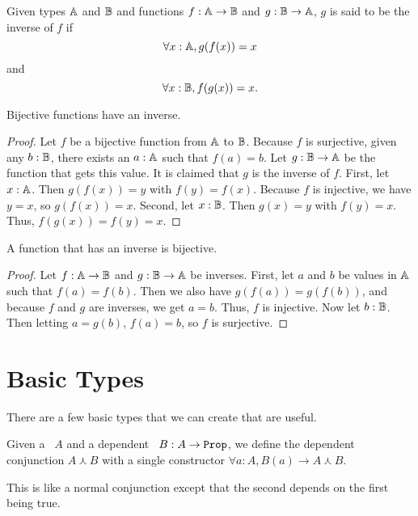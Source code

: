\documentclass[../math.tex]{subfiles}
\begin{document}
\begin{definition}
    Given types $\mathbb{A}$ and $\mathbb{B}$ and functions $f : \mathbb{A} \rightarrow \mathbb{B}$ and $g : \mathbb{B}
    \rightarrow \mathbb{A}$, $g$ is said to be the inverse of $f$ if
    \[
        \forall x : \mathbb{A}, g(f(x)) = x
    \]
    and
    \[
        \forall x : \mathbb{B}, f(g(x)) = x.
    \]
\end{definition}

\begin{theorem}
    Bijective functions have an inverse.
\end{theorem}
\begin{proof}
    Let $f$ be a bijective function from $\mathbb{A}$ to $\mathbb{B}$.  Because $f$ is
    surjective, given any $b : \mathbb{B}$, there exists an $a : \mathbb{A}$ such that $f(a) =
    b$.  Let $g : \mathbb{B} \rightarrow \mathbb{A}$ be the function that gets this value.  It
    is claimed that $g$ is the inverse of $f$.  First, let $x : \mathbb{A}$.  Then
    $g(f(x)) = y$ with $f(y) = f(x)$.  Because $f$ is injective, we have $y =
    x$, so $g(f(x)) = x$.  Second, let $x : \mathbb{B}$.  Then $g(x) = y$ with $f(y) =
    x$.  Thus, $f(g(x)) = f(y) = x$.
\end{proof}

\begin{instance}
    A function that has an inverse is bijective.
\end{instance}
\begin{proof}
    Let $f : \mathbb{A} \rightarrow \mathbb{B}$ and $g : \mathbb{B} \rightarrow \mathbb{A}$ be inverses.  First,
    let $a$ and $b$ be values in $\mathbb{A}$ such that $f(a) = f(b)$.  Then we also
    have $g(f(a)) = g(f(b))$, and because $f$ and $g$ are inverses, we get $a =
    b$.  Thus, $f$ is injective.  Now let $b : \mathbb{B}$.  Then letting $a = g(b)$,
    $f(a) = b$, so $f$ is surjective.
\end{proof}

\section{Basic Types} \label{sec-types}

There are a few basic types that we can create that are useful.

\begin{definition}
    Given a \Prop\ $A$ and a dependent \Prop\ $B : A \rightarrow \Prop$, we
    define the dependent conjunction $A \curlywedge B$ with a single
    constructor $\forall a : A, B(a) \rightarrow A \curlywedge B$.
\end{definition}

This is like a normal conjunction except that the second \Prop depends on the
first \Prop being true.
\end{document}
